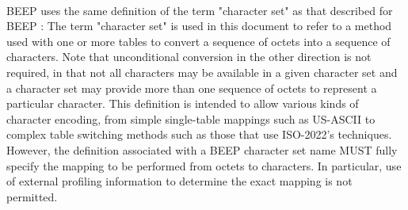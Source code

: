         \paragraph{}
      BEEP uses the same definition of the term "character set" as that
   described for BEEP :
      The term "character set" is used in this document to refer to a
   method used with one or more tables to convert a sequence of octets
   into a sequence of characters. Note that unconditional conversion in
   the other direction is not required, in that not all characters may
   be available in a given character set and a character set may provide
   more than one sequence of octets to represent a particular character.
   This definition is intended to allow various kinds of character
   encoding, from simple single-table mappings such as US-ASCII to
   complex table switching methods such as those that use ISO-2022's
   techniques. However, the definition associated with a BEEP character
   set name MUST fully specify the mapping to be performed from octets
   to characters. In particular, use of external profiling information
   to determine the exact mapping is not permitted.
